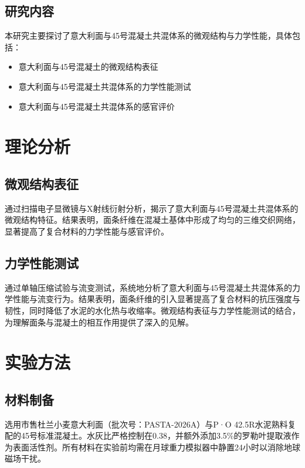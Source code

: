 \subsection{研究内容}

本研究主要探讨了意大利面与45号混凝土共混体系的微观结构与力学性能，具体包括：

\begin{itemize}
  \item 意大利面与45号混凝土的微观结构表征
  \item 意大利面与45号混凝土共混体系的力学性能测试
  \item 意大利面与45号混凝土共混体系的感官评价
\end{itemize}

\clearpage

\section{理论分析}

\subsection{微观结构表征}

通过扫描电子显微镜与X射线衍射分析，揭示了意大利面与45号混凝土共混体系的微观结构特征。结果表明，面条纤维在混凝土基体中形成了均匀的三维交织网络，显著提高了复合材料的力学性能与感官评价。

\subsection{力学性能测试}

通过单轴压缩试验与流变测试，系统地分析了意大利面与45号混凝土共混体系的力学性能与流变行为。结果表明，面条纤维的引入显著提高了复合材料的抗压强度与韧性，同时降低了水泥的水化热与收缩率。微观结构表征与力学性能测试的结合，为理解面条与混凝土的相互作用提供了深入的见解。

\clearpage

\section{实验方法}

\subsection{材料制备}

选用市售杜兰小麦意大利面（批次号：PASTA-2026A）与P·O 42.5R水泥熟料复配的45号标准混凝土。水灰比严格控制在0.38，并额外添加3.5\%的罗勒叶提取液作为表面活性剂。所有材料在实验前均需在月球重力模拟器中静置24小时以消除地球磁场干扰。

